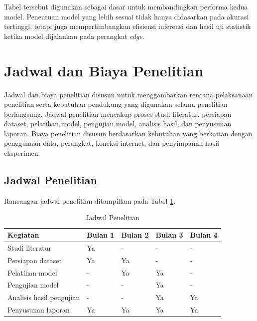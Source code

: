 \begin{sectioncontent}
\begin{subsectioncontent}
    Tabel tersebut digunakan sebagai dasar untuk membandingkan performa kedua model. Penentuan model yang lebih sesuai tidak hanya didasarkan pada akurasi tertinggi, tetapi juga mempertimbangkan efisiensi inferensi dan hasil uji statistik ketika model dijalankan pada perangkat \textit{edge}.
\end{subsectioncontent}
\end{sectioncontent}

\section{Jadwal dan Biaya Penelitian}
\begin{sectioncontent}
    \hspace{\parindent}Jadwal dan biaya penelitian disusun untuk menggambarkan rencana pelaksanaan penelitian serta kebutuhan pendukung yang digunakan selama penelitian berlangsung. Jadwal penelitian mencakup proses studi literatur, persiapan dataset, pelatihan model, pengujian model, analisis hasil, dan penyusunan laporan. Biaya penelitian disusun berdasarkan kebutuhan yang berkaitan dengan penggunaan data, perangkat, koneksi internet, dan penyimpanan hasil eksperimen.

    \subsection{Jadwal Penelitian}
    \begin{subsectioncontent}
        \hspace{\parindent}Rancangan jadwal penelitian ditampilkan pada Tabel \ref{tab:jadwal-penelitian}.

        \begin{table}[H]
            \centering
            \caption{Jadwal Penelitian}
            \label{tab:jadwal-penelitian}
            \begin{tabularx}{\linewidth}{|l|>{\centering\arraybackslash}X|>{\centering\arraybackslash}X|>{\centering\arraybackslash}X|>{\centering\arraybackslash}X|}
                \hline
                \textbf{Kegiatan} & \textbf{Bulan 1} & \textbf{Bulan 2} & \textbf{Bulan 3} & \textbf{Bulan 4} \\
                \hline
                Studi literatur & Ya & - & - & - \\
                \hline
                Persiapan dataset & Ya & Ya & - & - \\
                \hline
                Pelatihan model & - & Ya & Ya & - \\
                \hline
                Pengujian model & - & - & Ya & - \\
                \hline
                Analisis hasil pengujian & - & - & Ya & Ya \\
                \hline
                Penyusunan laporan & Ya & Ya & Ya & Ya \\
                \hline
            \end{tabularx}
        \end{table}
    \end{subsectioncontent}


\end{sectioncontent}
